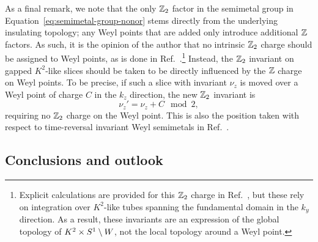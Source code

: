 As a final remark, we note that the only $\mathbb{Z}_2$ factor in the semimetal group in Equation~\eqref{eq:semimetal-group-nonor} stems directly from the underlying insulating topology; any Weyl points that are added only introduce additional $\mathbb{Z}$ factors. As such, it is the opinion of the author that no intrinsic $\mathbb{Z}_2$ charge should be assigned to Weyl points, as is done in Ref.~\cite{Fonseca-Vaidya_nonorientable}.\footnote{
	Explicit calculations are provided for this $\mathbb{Z}_2$ charge in Ref.~\cite{Fonseca-Vaidya_nonorientable}, but these rely on integration over $K^2$-like tubes spanning the fundamental domain in the $k_y$ direction. As a result, these invariants are an expression of the global topology of $K^2\times S^1\setminus W$, not the local topology around a Weyl point.}
Instead, the $\mathbb{Z}_2$ invariant on gapped $K^2$-like slices should be taken to be directly influenced by the $\mathbb{Z}$ charge on Weyl points. To be precise, if such a slice with invariant $\nu_z$ is moved over a Weyl point of charge $C$ in the $k_z$ direction, the new $\mathbb{Z}_2$ invariant is
\begin{equation*}
	\nu_z' = \nu_z + C \mod 2,
\end{equation*}
requiring no $\mathbb{Z}_2$ charge on the Weyl point. This is also the position taken with respect to time-reversal invariant Weyl semimetals in Ref.~\cite{Thiang_equivariant}.
	
\subsection{Conclusions and outlook}




